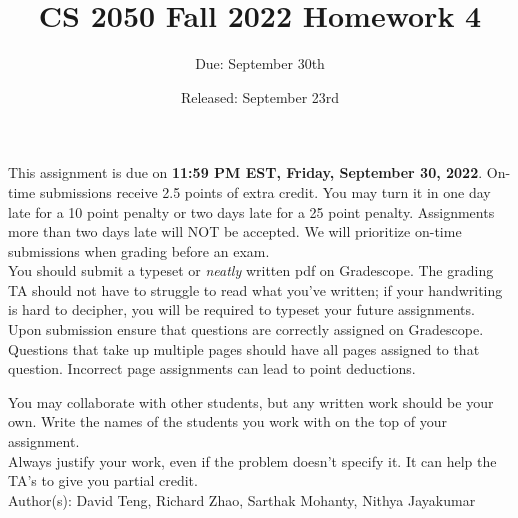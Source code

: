 \documentclass{article}
\title{CS 2050 Fall 2022 Homework 4}
\author{Due: September 30th}
\date{Released: September 23rd}
\begin{document}
\maketitle

This assignment is due on \textbf{11:59 PM EST, Friday, September 30, 2022}.  On-time submissions receive 2.5 points of extra credit. You may turn it in one day late for a 10 point penalty or two days late for a 25 point penalty. Assignments more than two days late will NOT be accepted.  We will prioritize on-time submissions when grading before an exam. \\ 

You should submit a typeset or \emph{neatly} written pdf on Gradescope.  The grading TA should not have to struggle to read what you've written; if your handwriting is hard to decipher, you will be required to typeset your future assignments.\\ 

Upon submission ensure that questions are correctly assigned on Gradescope. Questions that take up multiple pages should have all pages assigned to that question. Incorrect page assignments can lead to point deductions.

You may collaborate with other students, but any written work should be your own. Write the names of the students you work with on the top of your assignment.\\

Always justify your work, even if the problem doesn't specify it. It can help the TA's to give you partial credit.
\\

Author(s): David Teng, Richard Zhao, Sarthak Mohanty, Nithya Jayakumar

\clearpage
\end{document}
